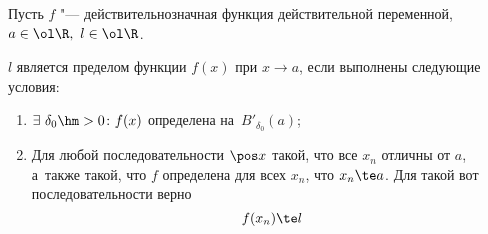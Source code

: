 \label{ge}
Пусть $f$ "--- действительнозначная функция действительной переменной, $a\in\ol\R,\ l\in\ol\R$.

$l$ является пределом функции $f(x)$ при $x\to a$, если выполнены следующие условия:

\begin{enumerate}
    \item   $\exists\ \delta_0\hm>0\colon f(x)$ определена на~$B'_{\delta_0}(a)$;

    \item Для любой последовательности $ \pos x$ такой, что все $x_n$ отличны от $a$, а~также такой,
     что $f$ определена для всех $x_n$, что $x_n\te a$.
     Для такой вот последовательности верно
        $$f(x_n)\te l$$
\end{enumerate}


